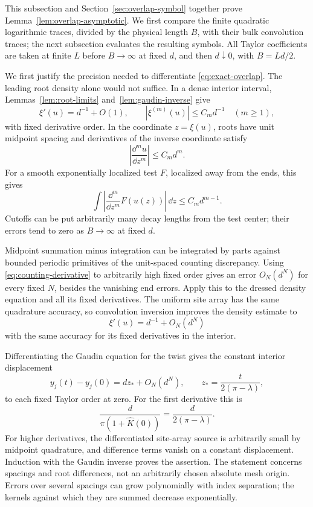 This subsection and Section~\ref{sec:overlap-symbol} together prove
Lemma~\ref{lem:overlap-asymptotic}. We first compare the finite quadratic
logarithmic traces, divided by the physical length \(B\), with their bulk
convolution traces; the next subsection evaluates the resulting symbols.
All Taylor coefficients are taken at finite \(L\) before \(B\to\infty\)
at fixed \(d\), and then \(d\downarrow0\), with \(B=Ld/2\).

We first justify the precision needed to differentiate
\eqref{eq:exact-overlap}. The leading root density alone would not suffice.
In a dense interior interval, Lemmas~\ref{lem:root-limits}
and~\ref{lem:gaudin-inverse} give
\[
 \xi'(u)=d^{-1}+O(1),\qquad
 |\xi^{(m)}(u)|\le C_m d^{-1}\quad(m\ge1),
\]
with fixed derivative order. In the coordinate \(z=\xi(u)\), roots have
unit midpoint spacing and derivatives of the inverse coordinate satisfy
\[
 \left|\frac{\dd^m u}{\dd z^m}\right|\le C_m d^m.
\]
For a smooth exponentially localized test \(F\), localized away from the
ends, this gives
\begin{equation}\label{eq:counting-derivative}
 \int\left|
       \frac{\dd^m}{\dd z^m}F(u(z))\right|\,\dd z
       \le C_m d^{m-1}.
\end{equation}
Cutoffs can be put arbitrarily many decay lengths from the test center;
their errors tend to zero as \(B\to\infty\) at fixed \(d\).

Midpoint summation minus integration can be integrated by parts against
bounded periodic primitives of the unit-spaced counting discrepancy.
Using \eqref{eq:counting-derivative} to arbitrarily high fixed order gives
an error \(O_N(d^N)\) for every fixed \(N\), besides the vanishing
end errors. Apply this to the dressed density equation and all its
fixed derivatives. The uniform site array has the same quadrature
accuracy, so convolution inversion improves the density estimate to
\begin{equation}\label{eq:all-order-density}
 \xi'(u)=d^{-1}+O_N(d^N)
\end{equation}
with the same accuracy for its fixed derivatives in the interior.

Differentiating the Gaudin equation for the twist gives the constant
interior displacement
\[
 y_j(t)-y_j(0)
   = d z_*+O_N(d^N),\qquad
 z_*=\frac{t}{2(\pi-\lambda)},
\]
to each fixed Taylor order at zero. For the first derivative this is
\[
 \frac{d}{\pi(1+\widehat K(0))}
       =\frac{d}{2(\pi-\lambda)}.
\]
For higher derivatives, the differentiated site-array source is
arbitrarily small by midpoint quadrature, and difference terms vanish
on a constant displacement. Induction with the Gaudin inverse proves the
assertion. The statement concerns spacings and root differences, not an
arbitrarily chosen absolute mesh origin. Errors over several spacings
can grow polynomially with index separation; the kernels against which
they are summed decrease exponentially.

